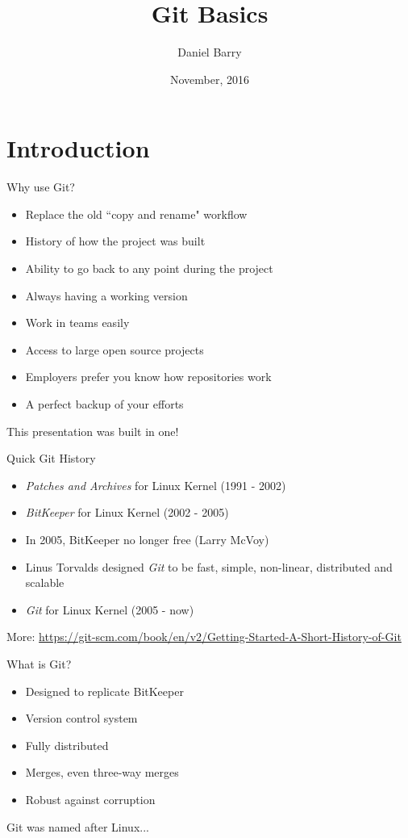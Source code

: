 \documentclass{beamer}
\title{Git Basics}
\date{November, 2016}
\author{Daniel Barry}
\institute{University of Hertfordshire}
\begin{document}
  \maketitle
  \section{Introduction}
  \begin{frame}{Why use Git?}
    \begin{itemize}
      \item Replace the old ``copy and rename" workflow
      \item History of how the project was built
      \item Ability to go back to any point during the project
      \item Always having a working version
      \item Work in teams easily
      \item Access to large open source projects
      \item Employers prefer you know how repositories work
      \item A perfect backup of your efforts
    \end{itemize}
    This presentation was built in one!
  \end{frame}
  \begin{frame}{Quick Git History}
    \begin{itemize}
      \item \emph{Patches and Archives} for Linux Kernel (1991 - 2002)
      \item \emph{BitKeeper} for Linux Kernel (2002 - 2005)
      \item In 2005, BitKeeper no longer free (Larry McVoy)
      \item Linus Torvalds designed \emph{Git} to be fast, simple, non-linear,
        distributed and scalable
      \item \emph{Git} for Linux Kernel (2005 - now)
    \end{itemize}
    More:
    \url{https://git-scm.com/book/en/v2/Getting-Started-A-Short-History-of-Git}
  \end{frame}
  \begin{frame}{What is Git?}
    \begin{itemize}
      \item Designed to replicate BitKeeper
      \item Version control system
      \item Fully distributed
      \item Merges, even three-way merges
      \item Robust against corruption
    \end{itemize}
    Git was named after Linux...
  \end{frame}
\end{document}

